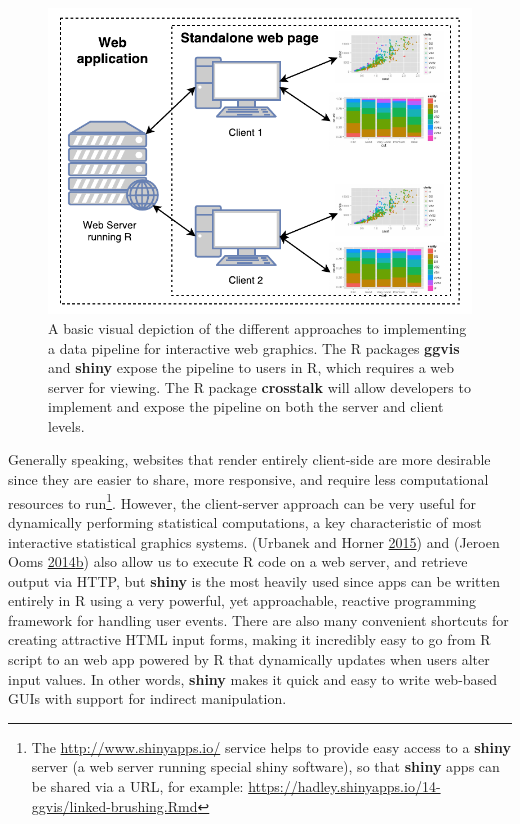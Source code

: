 \documentclass[12pt,]{isuthesis}
\let\rmarkdownfootnote\footnote%
\def\footnote{\protect\rmarkdownfootnote}
\begin{document}
\begin{figure}[htbp]
\centering
\includegraphics{images/server-client.pdf}
\caption{\label{fig:server-client}A basic visual depiction of the different
approaches to implementing a data pipeline for interactive web graphics.
The R packages \textbf{ggvis} and \textbf{shiny} expose the pipeline to
users in R, which requires a web server for viewing. The R package
\textbf{crosstalk} will allow developers to implement and expose the
pipeline on both the server and client levels.}
\end{figure}

Generally speaking, websites that render entirely client-side are more
desirable since they are easier to share, more responsive, and require
less computational resources to run\footnote{The
  \url{http://www.shinyapps.io/} service helps to provide easy access to
  a \textbf{shiny} server (a web server running special shiny software),
  so that \textbf{shiny} apps can be shared via a URL, for example:
  \url{https://hadley.shinyapps.io/14-ggvis/linked-brushing.Rmd}}.
However, the client-server approach can be very useful for dynamically
performing statistical computations, a key characteristic of most
interactive statistical graphics systems. (Urbanek and Horner
\protect\hyperlink{ref-FastRWeb}{2015}) and (Jeroen Ooms
\protect\hyperlink{ref-opencpu}{2014}\protect\hyperlink{ref-opencpu}{b})
also allow us to execute R code on a web server, and retrieve output via
HTTP, but \textbf{shiny} is the most heavily used since apps can be
written entirely in R using a very powerful, yet approachable, reactive
programming framework for handling user events. There are also many
convenient shortcuts for creating attractive HTML input forms, making it
incredibly easy to go from R script to an web app powered by R that
dynamically updates when users alter input values. In other words,
\textbf{shiny} makes it quick and easy to write web-based GUIs with
support for indirect manipulation.
\end{document}
